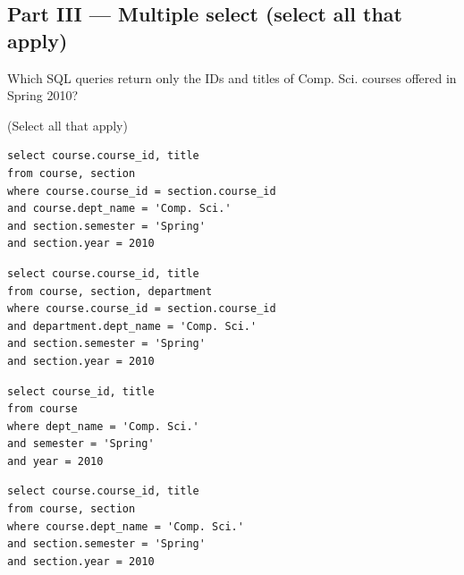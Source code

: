 \documentclass[12pt, addpoints, answers]{exam}
\begin{document}
\begin{questions}
\section*{Part III — Multiple select (select all that apply)}

\begin{minipage}{\linewidth}
\question[6]
Which SQL queries return only the IDs and titles of Comp. Sci. courses offered in Spring 2010?\par\vspace{0.5em}
(Select all that apply)\par\vspace{0.5em}
\begin{checkboxes} 
    \CorrectChoice \begin{verbatim}
select course.course_id, title
from course, section
where course.course_id = section.course_id
and course.dept_name = 'Comp. Sci.'
and section.semester = 'Spring'
and section.year = 2010
    \end{verbatim}
    \choice \begin{verbatim}
select course.course_id, title
from course, section, department
where course.course_id = section.course_id
and department.dept_name = 'Comp. Sci.'
and section.semester = 'Spring'
and section.year = 2010
    \end{verbatim}
    \choice \begin{verbatim}
select course_id, title
from course
where dept_name = 'Comp. Sci.'
and semester = 'Spring'
and year = 2010
    \end{verbatim}
    \choice \begin{verbatim}
select course.course_id, title
from course, section
where course.dept_name = 'Comp. Sci.'
and section.semester = 'Spring'
and section.year = 2010
    \end{verbatim}
\end{checkboxes}
\end{minipage}\vspace{1em}


\end{questions}
\end{document}
